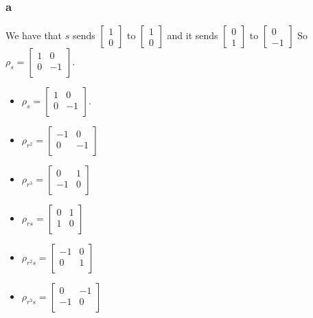\documentclass[]{article}
\begin{document}
\subsubsection{a}
We have that $s$ sends $
\begin{bmatrix}
	1\\
	0
\end{bmatrix}
$
to 
$
\begin{bmatrix}
	1\\
	0
\end{bmatrix}
$
and it sends 
$
\begin{bmatrix}
	0\\
	1
\end{bmatrix}
$
to
$
\begin{bmatrix}
	0\\
	-1
\end{bmatrix}
$
So $\rho_s =
\begin{bmatrix}
	1 & 0 \\
	0 & -1\\
\end{bmatrix}
$.
\begin{itemize}
	\item $\rho_s =
	\begin{bmatrix}
		1 & 0 \\
		0 & -1\\
	\end{bmatrix}
	$.
	\item $\rho_{r^2} = 
	\begin{bmatrix}
		-1 & 0 \\
		0 & -1\\
	\end{bmatrix}
	$
	\item $\rho_{r^3} = 
	\begin{bmatrix}
		0 & 1 \\
		-1 & 0\\
	\end{bmatrix}
	$
	\item $\rho_{rs} = 
	\begin{bmatrix}
		0 & 1 \\
		1 & 0\\
	\end{bmatrix}
	$
	\item $\rho_{r^2s} = 
	\begin{bmatrix}
		-1 & 0 \\
		0 & 1\\
	\end{bmatrix}
	$
	\item $\rho_{r^3s} = 
	\begin{bmatrix}
		0 & -1 \\
		-1 & 0\\
	\end{bmatrix}
	$
\end{itemize}
\end{document}
